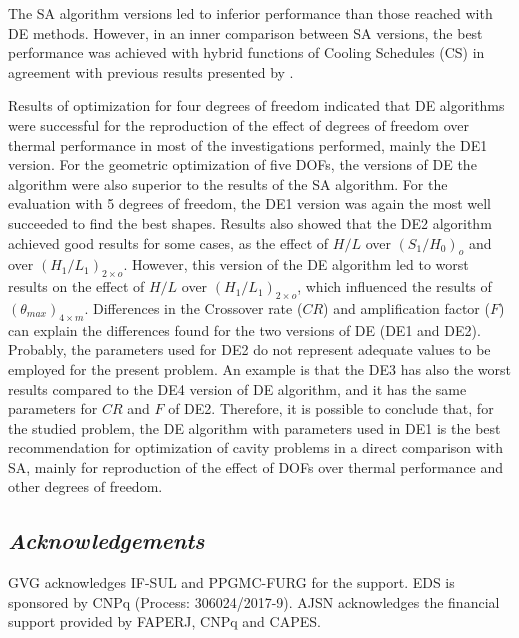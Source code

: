 \documentclass[12pt,fleqn]{article}
\begin{document}
The SA algorithm versions led to inferior performance than those reached with DE methods. However, in an inner comparison between SA versions, the best performance was achieved with hybrid functions of Cooling Schedules (CS) in agreement with previous results presented by \cite{Gonzales2015a,Gonzales2015b}.

Results of optimization for four degrees of freedom indicated that DE algorithms were successful for the reproduction of the effect of degrees of freedom over thermal performance in most of the investigations performed, mainly the DE1 version. For the geometric optimization of five DOFs, the versions of DE the algorithm  were also superior to the results of the SA algorithm. For the evaluation with 5 degrees of freedom, the DE1 version was again the most well succeeded to find the best shapes. Results also showed that the DE2 algorithm achieved good results for some cases, as the effect of $H/L$ over ${(S_{1}/H_{0})_{o}}$ and over ${(H_{1}/L_{1})_{2  \times o}}$. However, this version of the DE algorithm led to worst results on the effect of $H/L$ over ${(H_{1}/L_{1})_{2  \times o}}$, which influenced the results of $({\theta}_{max})_{4\times m}$. Differences in the Crossover rate ($CR$) and amplification factor ($F$) can explain the differences found for the two versions of DE (DE1 and DE2). Probably, the parameters used for DE2 do not represent adequate values to be employed for the present problem. An example is that the DE3 has also the worst results compared to the DE4 version of DE algorithm, and it has the same parameters for $CR$ and $F$ of DE2. Therefore, it is possible to conclude that, for the studied problem, the DE algorithm with parameters used in DE1 is the best recommendation for optimization of cavity problems in a direct comparison with SA, mainly for reproduction of the effect of DOFs over thermal performance and other degrees of freedom.


\subsection*{\textit{Acknowledgements}}
GVG acknowledges IF-SUL and PPGMC-FURG for the support. EDS is sponsored by CNPq (Process: 306024/2017-9). AJSN acknowledges the financial support provided by FAPERJ, CNPq and CAPES.



\fontsize{11}{0}\selectfont







\end{document}

